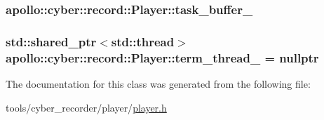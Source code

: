 \hypertarget{classapollo_1_1cyber_1_1record_1_1Player_a7a09a28c3998b3d7f897ced5e0deaef7}{
\subsubsection[{task\-\_\-buffer\-\_\-}]{ apollo\-::cyber\-::record\-::\-Player\-::task\-\_\-buffer\-\_\-\hspace{0.3cm}{\ttfamily [private]}}}\label{classapollo_1_1cyber_1_1record_1_1Player_a7a09a28c3998b3d7f897ced5e0deaef7}
\hypertarget{classapollo_1_1cyber_1_1record_1_1Player_a2b9c27a08ad0b994faf3476196daea5c}{
\subsubsection[{term\-\_\-thread\-\_\-}]{\setlength{\rightskip}{0pt plus 5cm}std\-::shared\-\_\-ptr$<$std\-::thread$>$ apollo\-::cyber\-::record\-::\-Player\-::term\-\_\-thread\-\_\- = nullptr\hspace{0.3cm}{\ttfamily [private]}}}\label{classapollo_1_1cyber_1_1record_1_1Player_a2b9c27a08ad0b994faf3476196daea5c}


The documentation for this class was generated from the following file\-:\begin{DoxyCompactItemize}
\item 
tools/cyber\-\_\-recorder/player/\hyperlink{player_8h}{player.\-h}\end{DoxyCompactItemize}
